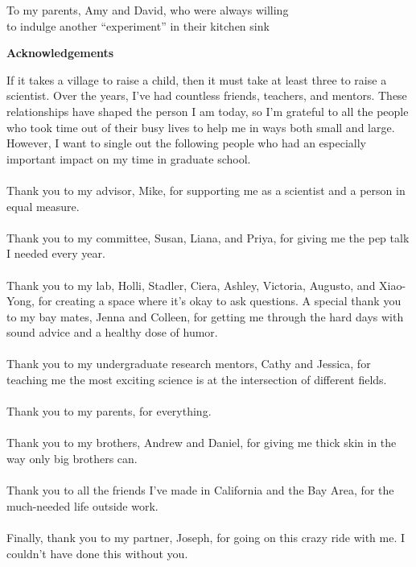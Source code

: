 \documentclass[11pt,letterpaper,oneside]{book}
\begin{document}
\setcounter{page}{1}  %

\null  %
\vfill
\begin{center}
    To my parents, Amy and David, who were always willing\\
    to indulge another ``experiment'' in their kitchen sink
\end{center}
\vfill
\clearpage

\begin{center}
    \bfseries\Large Acknowledgements
\end{center}
\bigskip
If it takes a village to raise a child, then it must take at least three to raise a scientist. Over the years, I've had countless friends, teachers, and mentors. These relationships have shaped the person I am today, so I'm grateful to all the people who took time out of their busy lives to help me in ways both small and large. However, I want to single out the following people who had an especially important impact on my time in graduate school.\\\\
Thank you to my advisor, Mike, for supporting me as a scientist and a person in equal measure.\\\\
Thank you to my committee, Susan, Liana, and Priya, for giving me the pep talk I needed every year.\\\\
Thank you to my lab, Holli, Stadler, Ciera, Ashley, Victoria, Augusto, and Xiao-Yong, for creating a space where it's okay to ask questions. A special thank you to my bay mates, Jenna and Colleen, for getting me through the hard days with sound advice and a healthy dose of humor.\\\\
Thank you to my undergraduate research mentors, Cathy and Jessica, for teaching me the most exciting science is at the intersection of different fields.\\\\
Thank you to my parents, for everything.\\\\
Thank you to my brothers, Andrew and Daniel, for giving me thick skin in the way only big brothers can.\\\\
Thank you to all the friends I've made in California and the Bay Area, for the much-needed life outside work.\\\\
Finally, thank you to my partner, Joseph, for going on this crazy ride with me. I couldn't have done this without you.
\clearpage
\end{document}
